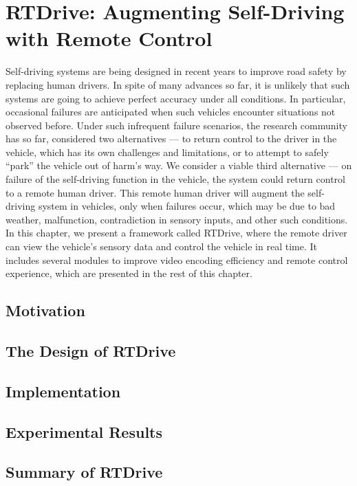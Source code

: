 


\chapter{RTDrive: Augmenting Self-Driving with Remote Control}
\label{chapter_rtdrive}

Self-driving systems are being designed in recent years 
to improve road safety by replacing human drivers. 
In spite of many advances so far, it is unlikely that such systems are
going to achieve perfect accuracy under all conditions. In
particular, occasional failures are anticipated when such vehicles
encounter situations not observed before. Under such
infrequent failure scenarios, the research community has so
far, considered two alternatives — to return control to the
driver in the vehicle, which has its own challenges and limitations,
or to attempt to safely “park” the vehicle out of
harm’s way. We consider a viable third alternative — on
failure of the self-driving function in the vehicle, the system
could return control to a remote human driver. This remote
human driver will augment the self-driving system in vehicles,
only when failures occur, which may be due to bad
weather, malfunction, contradiction in sensory inputs, and
other such conditions.
In this chapter, we present a framework called
RTDrive, where the remote driver can view the vehicle’s sensory
data and control the vehicle in real time.
It includes several modules to improve video encoding
efficiency and remote control experience, which are
presented in the rest of this chapter. 


\section{Motivation}




\section{The Design of RTDrive}



\section{Implementation}



\section{Experimental Results}




\section{Summary of RTDrive}



%


